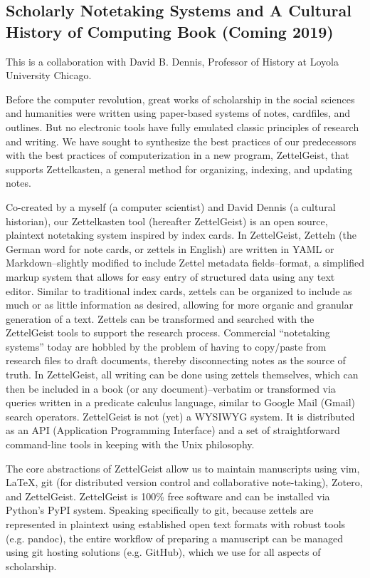 \subsection{Scholarly Notetaking Systems and A Cultural History of Computing Book (Coming 2019)}

This is a collaboration with David B. Dennis, Professor of History at Loyola University Chicago.
\vspace{5pt}

Before the computer revolution, great works of scholarship in the social sciences and humanities were written using paper-based systems of notes, cardfiles, and outlines.  But no electronic tools have fully emulated classic principles of research and writing. We have sought to synthesize the best practices of our predecessors with the best practices of computerization in a new program, ZettelGeist, that supports Zettelkasten, a general method for organizing, indexing, and updating notes.
\vspace{5pt}

Co-created by a myself (a computer scientist) and David Dennis (a cultural historian), our Zettelkasten tool (hereafter ZettelGeist) is an open source, plaintext notetaking system inspired by index cards. In ZettelGeist, Zetteln (the German word for note cards, or zettels in English) are written in YAML or Markdown--slightly modified to include Zettel metadata fields--format, a simplified markup system that allows for easy entry of structured data using any text editor. Similar to traditional index cards, zettels can be organized to include as much or as little information as desired, allowing for more organic and granular generation of a text. Zettels can be transformed and searched with the ZettelGeist tools to support the research process. Commercial “notetaking systems” today are hobbled by the problem of having to copy/paste from research files to draft documents, thereby disconnecting notes as the source of truth. In ZettelGeist, all writing can be done using zettels themselves, which can then be included in a book (or any document)--verbatim or transformed via queries written in a predicate calculus language, similar to Google Mail (Gmail) search operators. ZettelGeist is not (yet) a WYSIWYG system. It is distributed as an API (Application Programming Interface) and a set of straightforward command-line tools in keeping with the Unix philosophy.
\vspace{5pt}

The core abstractions of ZettelGeist allow us to maintain manuscripts using vim, LaTeX, git (for distributed version control and collaborative note-taking), Zotero, and ZettelGeist. ZettelGeist is 100\% free software and can be installed via Python’s PyPI system. Speaking specifically to git, because zettels are represented in plaintext using established open text formats with robust tools (e.g. pandoc), the entire workflow of preparing a manuscript can be managed using git hosting solutions (e.g. GitHub), which we use for all aspects of scholarship. 
\vspace{5pt}

